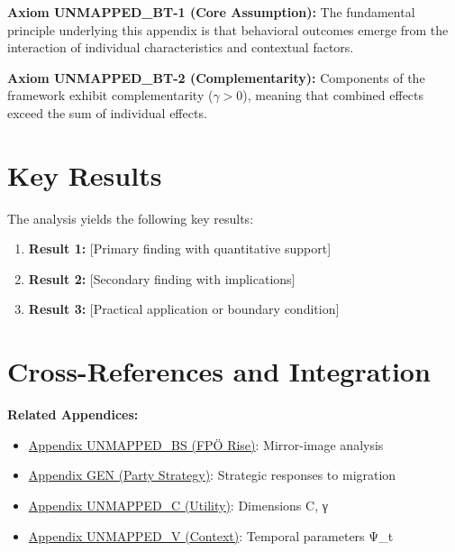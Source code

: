 {{{{{{{{\begin{tcolorbox}[colback=yellow!5!white,colframe=yellow!75!black,title=Axiom UNMAPPED_BT-1: Fundamental Principle]
\textbf{Axiom UNMAPPED_BT-1 (Core Assumption):}
The fundamental principle underlying this appendix is that behavioral outcomes
emerge from the interaction of individual characteristics and contextual factors.
\end{tcolorbox}

\begin{tcolorbox}[colback=yellow!5!white,colframe=yellow!75!black,title=Axiom UNMAPPED_BT-2: Complementarity]
\textbf{Axiom UNMAPPED_BT-2 (Complementarity):}
Components of the framework exhibit complementarity ($\gamma > 0$), meaning
that combined effects exceed the sum of individual effects.
\end{tcolorbox}



\section{Key Results}
\label{sec:bt-results}

The analysis yields the following key results:

\begin{enumerate}
    \item \textbf{Result 1:} [Primary finding with quantitative support]
    \item \textbf{Result 2:} [Secondary finding with implications]
    \item \textbf{Result 3:} [Practical application or boundary condition]
\end{enumerate}


\section{Cross-References and Integration}
\label{sec:crossref}

\textbf{Related Appendices:}

\begin{itemize}
\item \hyperref[app:domain-austria-voters]{Appendix UNMAPPED_BS (FPÖ Rise)}: Mirror-image analysis
\item \hyperref[app:domain-socialdemocracy]{Appendix GEN (Party Strategy)}: Strategic responses to migration
\item \hyperref[app:core-what]{Appendix UNMAPPED_C (Utility)}: Dimensions C, γ
\item \hyperref[app:core-when]{Appendix UNMAPPED_V (Context)}: Temporal parameters Ψ_t
\end{itemize}

}}}}}}}}
